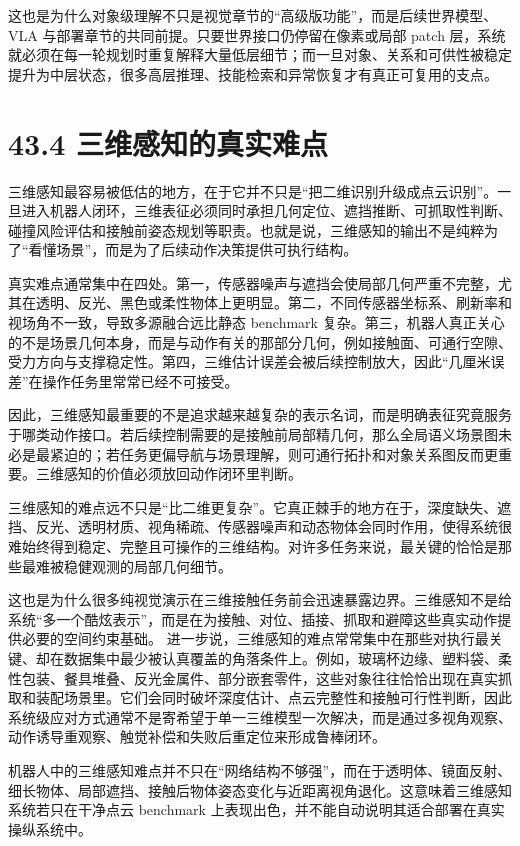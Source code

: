 这也是为什么对象级理解不只是视觉章节的“高级版功能”，而是后续世界模型、VLA 与部署章节的共同前提。只要世界接口仍停留在像素或局部 patch 层，系统就必须在每一轮规划时重复解释大量低层细节；而一旦对象、关系和可供性被稳定提升为中层状态，很多高层推理、技能检索和异常恢复才有真正可复用的支点。

\section*{43.4 三维感知的真实难点}


三维感知最容易被低估的地方，在于它并不只是“把二维识别升级成点云识别”。一旦进入机器人闭环，三维表征必须同时承担几何定位、遮挡推断、可抓取性判断、碰撞风险评估和接触前姿态规划等职责。也就是说，三维感知的输出不是纯粹为了“看懂场景”，而是为了后续动作决策提供可执行结构。

真实难点通常集中在四处。第一，传感器噪声与遮挡会使局部几何严重不完整，尤其在透明、反光、黑色或柔性物体上更明显。第二，不同传感器坐标系、刷新率和视场角不一致，导致多源融合远比静态 benchmark 复杂。第三，机器人真正关心的不是场景几何本身，而是与动作有关的那部分几何，例如接触面、可通行空隙、受力方向与支撑稳定性。第四，三维估计误差会被后续控制放大，因此“几厘米误差”在操作任务里常常已经不可接受。

因此，三维感知最重要的不是追求越来越复杂的表示名词，而是明确表征究竟服务于哪类动作接口。若后续控制需要的是接触前局部精几何，那么全局语义场景图未必是最紧迫的；若任务更偏导航与场景理解，则可通行拓扑和对象关系图反而更重要。三维感知的价值必须放回动作闭环里判断。

三维感知的难点远不只是“比二维更复杂”。它真正棘手的地方在于，深度缺失、遮挡、反光、透明材质、视角稀疏、传感器噪声和动态物体会同时作用，使得系统很难始终得到稳定、完整且可操作的三维结构。对许多任务来说，最关键的恰恰是那些最难被稳健观测的局部几何细节。

这也是为什么很多纯视觉演示在三维接触任务前会迅速暴露边界。三维感知不是给系统“多一个酷炫表示”，而是在为接触、对位、插接、抓取和避障这些真实动作提供必要的空间约束基础。 进一步说，三维感知的难点常常集中在那些对执行最关键、却在数据集中最少被认真覆盖的角落条件上。例如，玻璃杯边缘、塑料袋、柔性包装、餐具堆叠、反光金属件、部分嵌套零件，这些对象往往恰恰出现在真实抓取和装配场景里。它们会同时破坏深度估计、点云完整性和接触可行性判断，因此系统级应对方式通常不是寄希望于单一三维模型一次解决，而是通过多视角观察、动作诱导重观察、触觉补偿和失败后重定位来形成鲁棒闭环。

机器人中的三维感知难点并不只在“网络结构不够强”，而在于透明体、镜面反射、细长物体、局部遮挡、接触后物体姿态变化与近距离视角退化。这意味着三维感知系统若只在干净点云 benchmark 上表现出色，并不能自动说明其适合部署在真实操纵系统中。

